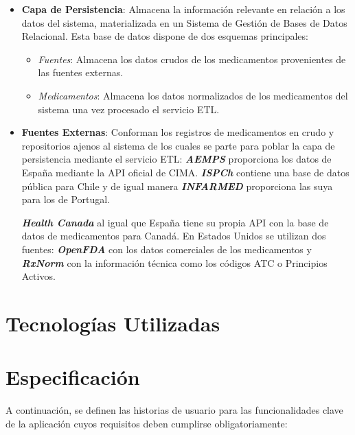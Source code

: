 \documentclass[12pt, a4paper]{report}
\begin{document}
\begin{itemize}
    \item \textbf{Capa de Persistencia}: Almacena la información relevante en relación a los datos del sistema, materializada en un Sistema de Gestión de Bases de Datos Relacional. Esta base de datos dispone de dos esquemas principales:
    \begin{itemize}
        \item \textit{Fuentes}: Almacena los datos crudos de los medicamentos provenientes de las fuentes externas.
        \item \textit{Medicamentos}: Almacena los datos normalizados de los medicamentos del sistema una vez procesado el servicio ETL.
    \end{itemize}

    \item \textbf{Fuentes Externas}: Conforman los registros de medicamentos en crudo y repositorios ajenos al sistema de los cuales se parte para poblar la capa de persistencia mediante el servicio ETL: \textbf{\textit{AEMPS}} proporciona los datos de España mediante la API oficial de CIMA. \textbf{\textit{ISPCh}} contiene una base de datos pública para Chile y de igual manera \textbf{\textit{INFARMED}} proporciona las suya para los de Portugal\cite{2}\cite{3}\cite{4}\cite{5}.

    \textbf{\textit{Health Canada}} al igual que España tiene su propia API con la base de datos de medicamentos para Canadá. En Estados Unidos se utilizan dos fuentes: \textbf{\textit{OpenFDA}} con los datos comerciales de los medicamentos y \textbf{\textit{RxNorm}} con la información técnica como los códigos ATC o Principios Activos\cite{6}\cite{7}\cite{8}.
\end{itemize}

\newpage

\chapter{Tecnologías Utilizadas}
\newpage

\chapter{Especificación}
A continuación, se definen las historias de usuario para las funcionalidades clave de la aplicación cuyos requisitos deben cumplirse obligatoriamente:
\end{document}
